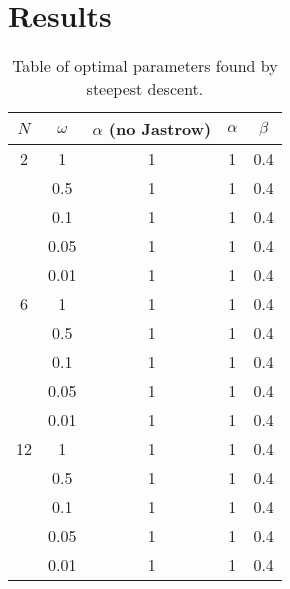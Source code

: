 \documentclass[a4paper,English,10pt]{article}
\begin{document}
\section{Results}

\begin{table}
  \begin{center}
    \caption{Table of optimal parameters found by steepest descent.}
    \label{paramtab}
    
    \begin{tabular}{*{5}c}
      \toprule
      $N$ & $\omega$ & $\alpha$ (no Jastrow) & $\alpha$ & $\beta$ \\
      \midrule
      2 & 1 & 1 & 1 & 0.4\\
      & 0.5 & 1 & 1 & 0.4\\
      & 0.1 & 1 & 1 & 0.4\\
      & 0.05 & 1 & 1 & 0.4\\
      & 0.01 & 1 & 1 & 0.4\\
        \midrule
      6 & 1 & 1 & 1 & 0.4\\
      & 0.5 & 1 & 1 & 0.4\\
      & 0.1 & 1 & 1 & 0.4\\
      & 0.05 & 1 & 1 & 0.4\\
      & 0.01 & 1 & 1 & 0.4\\
      \midrule
      12 & 1 & 1 & 1 & 0.4\\
      & 0.5 & 1 & 1 & 0.4\\
      & 0.1 & 1 & 1 & 0.4\\
      & 0.05 & 1 & 1 & 0.4\\
      & 0.01 & 1 & 1 & 0.4\\
      \bottomrule
    \end{tabular}
    \end{center}
\end{table}
\end{document}
